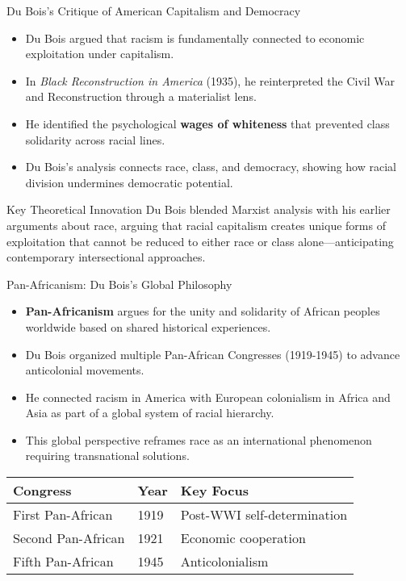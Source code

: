 \documentclass{beamer}
\begin{document}
	\begin{frame}{Du Bois's Critique of American Capitalism and Democracy}
		\begin{itemize}
			\item Du Bois argued that racism is fundamentally connected to economic exploitation under capitalism.
			\item In \textit{Black Reconstruction in America} (1935), he reinterpreted the Civil War and Reconstruction through a materialist lens.
			\item He identified the psychological \textbf{wages of whiteness} that prevented class solidarity across racial lines.
			\item Du Bois's analysis connects race, class, and democracy, showing how racial division undermines democratic potential.
		\end{itemize}
		
		\begin{block}{Key Theoretical Innovation}
			Du Bois blended Marxist analysis with his earlier arguments about race, arguing that racial capitalism creates unique forms of exploitation that cannot be reduced to either race or class alone—anticipating contemporary intersectional approaches.
		\end{block}
	\end{frame}
	
	\begin{frame}{Pan-Africanism: Du Bois's Global Philosophy}
		\begin{itemize}
			\item \textbf{Pan-Africanism} argues for the unity and solidarity of African peoples worldwide based on shared historical experiences.
			\item Du Bois organized multiple Pan-African Congresses (1919-1945) to advance anticolonial movements.
			\item He connected racism in America with European colonialism in Africa and Asia as part of a global system of racial hierarchy.
			\item This global perspective reframes race as an international phenomenon requiring transnational solutions.
		\end{itemize}
		
		\begin{tabular}{|l|l|l|}
			\hline
			\textbf{Congress} & \textbf{Year} & \textbf{Key Focus} \\
			\hline
			First Pan-African & 1919 & Post-WWI self-determination \\
			Second Pan-African & 1921 & Economic cooperation \\
			Fifth Pan-African & 1945 & Anticolonialism \\
			\hline
		\end{tabular}
	\end{frame}
	
\end{document}
